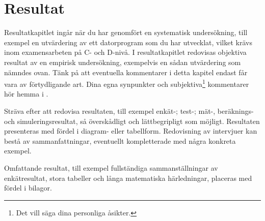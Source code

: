 \chapter{Resultat}
\label{ch:results}
\noindent
Resultatkapitlet ingår när du har genomfört en systematisk undersökning, till 
exempel en utvärdering av ett datorprogram som du har utvecklat, vilket krävs 
inom examensarbeten på C- och D-nivå.
I resultatkapitlet redovisas objektiva resultat av en empirisk undersökning, 
exempelvis en sådan utvärdering som nämndes ovan.
Tänk på att eventuella kommentarer i detta kapitel endast får vara av 
förtydligande art.
Dina egna synpunkter och subjektiva\footnote{%
	Det vill säga dina personliga åsikter.
} kommentarer hör hemma i .

Sträva efter att redovisa resultaten, till exempel enkät-; test-; mät-, 
beräknings- och simuleringsresultat, så överskådligt och lättbegripligt som 
möjligt.
Resultaten presenteras med fördel i diagram- eller tabellform.
Redovisning av intervjuer kan bestå av sammanfattningar, eventuellt 
kompletterade med några konkreta exempel.

Omfattande resultat, till exempel fullständiga sammanställningar av 
enkätresultat, stora tabeller och långa matematiska härledningar, placeras med 
fördel i bilagor.

